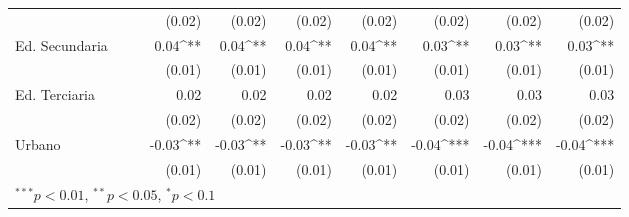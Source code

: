 \documentclass[12pt,letterpaper]{article}
\begin{document}
\begin{landscape}
\begin{table}
\begin{center}
\begin{tabular}{l D{.}{.}{5} D{.}{.}{5} D{.}{.}{5} D{.}{.}{5} D{.}{.}{5} D{.}{.}{5} D{.}{.}{5} D{.}{.}{5} D{.}{.}{5} }
				&                        &                        & (0.02)                 & (0.02)                 & (0.02)                 & (0.02)                 & (0.02)                 & (0.02)                 & (0.02)                 \\
				Ed. Secundaria             &                        &                        & 0.04^{**}              & 0.04^{**}              & 0.04^{**}              & 0.04^{**}              & 0.03^{**}              & 0.03^{**}              & 0.03^{**}              \\
				&                        &                        & (0.01)                 & (0.01)                 & (0.01)                 & (0.01)                 & (0.01)                 & (0.01)                 & (0.01)                 \\
				Ed. Terciaria              &                        &                        & 0.02                   & 0.02                   & 0.02                   & 0.02                   & 0.03                   & 0.03                   & 0.03                   \\
				&                        &                        & (0.02)                 & (0.02)                 & (0.02)                 & (0.02)                 & (0.02)                 & (0.02)                 & (0.02)                 \\
				Urbano                     &                        &                        & -0.03^{**}             & -0.03^{**}             & -0.03^{**}             & -0.03^{**}             & -0.04^{***}            & -0.04^{***}            & -0.04^{***}            \\
				&                        &                        & (0.01)                 & (0.01)                 & (0.01)                 & (0.01)                 & (0.01)                 & (0.01)                 & (0.01)                 \\ \hline
			\end{tabular}
		\end{center}
	\end{table}
	
	\newpage
	

\end{landscape}
\end{document}
